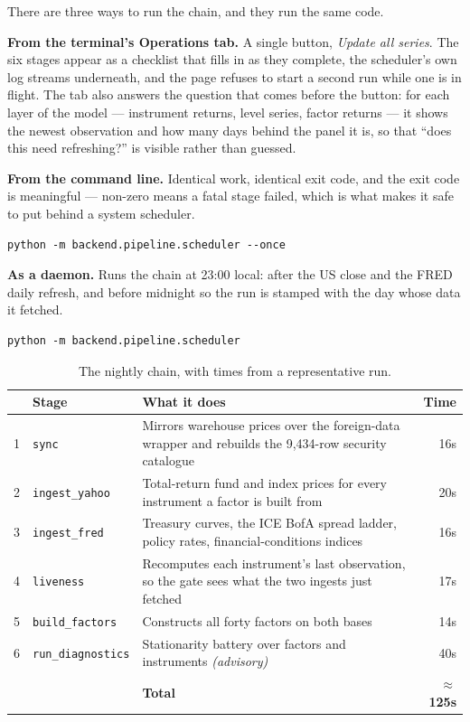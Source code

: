 \documentclass[11pt,a4paper]{article}
\newcommand{\code}[1]{\texttt{\small #1}}
\begin{document}
There are three ways to run the chain, and they run the same code.

\textbf{From the terminal's Operations tab.} A single button, \emph{Update all
series}. The six stages appear as a checklist that fills in as they complete, the
scheduler's own log streams underneath, and the page refuses to start a second run
while one is in flight. The tab also answers the question that comes before the
button: for each layer of the model --- instrument returns, level series, factor
returns --- it shows the newest observation and how many days behind the panel it
is, so that ``does this need refreshing?'' is visible rather than guessed.

\textbf{From the command line.} Identical work, identical exit code, and the exit
code is meaningful --- non-zero means a fatal stage failed, which is what makes it
safe to put behind a system scheduler.

\begin{lstlisting}
python -m backend.pipeline.scheduler --once
\end{lstlisting}

\textbf{As a daemon.} Runs the chain at 23:00 local: after the US close and the
FRED daily refresh, and before midnight so the run is stamped with the day whose
data it fetched.

\begin{lstlisting}
python -m backend.pipeline.scheduler
\end{lstlisting}

\begin{table}[htbp]
\centering
\caption{The nightly chain, with times from a representative run.}
\label{tab:chain}
\small
\begin{tabularx}{\textwidth}{@{}rlXr@{}}
\toprule
 & \textbf{Stage} & \textbf{What it does} & \textbf{Time} \\
\midrule
1 & \code{sync} & Mirrors warehouse prices over the foreign-data wrapper and
    rebuilds the 9{,}434-row security catalogue & 16s \\
2 & \code{ingest\_yahoo} & Total-return fund and index prices for every instrument
    a factor is built from & 20s \\
3 & \code{ingest\_fred} & Treasury curves, the ICE BofA spread ladder, policy rates,
    financial-conditions indices & 16s \\
4 & \code{liveness} & Recomputes each instrument's last observation, so the gate
    sees what the two ingests just fetched & 17s \\
5 & \code{build\_factors} & Constructs all forty factors on both bases & 14s \\
6 & \code{run\_diagnostics} & Stationarity battery over factors and instruments
    \emph{(advisory)} & 40s \\
\midrule
 & & \textbf{Total} & \textbf{$\approx$125s} \\
\bottomrule
\end{tabularx}
\end{table}
\end{document}
